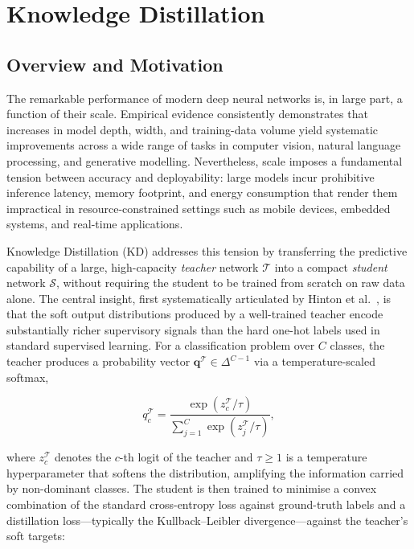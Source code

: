\chapter{Knowledge Distillation}
\label{chap:knowledge_distillation}

\section{Overview and Motivation}
\label{sec:kd_overview}

The remarkable performance of modern deep neural networks is, in large part, a function of their scale.
Empirical evidence consistently demonstrates that increases in model depth, width, and training-data volume
yield systematic improvements across a wide range of tasks in computer vision, natural language processing,
and generative modelling.
Nevertheless, scale imposes a fundamental tension between accuracy and deployability: large models incur
prohibitive inference latency, memory footprint, and energy consumption that render them impractical in
resource-constrained settings such as mobile devices, embedded systems, and real-time applications.

Knowledge Distillation (KD) addresses this tension by transferring the predictive capability of a large,
high-capacity \emph{teacher} network $\mathcal{T}$ into a compact \emph{student} network $\mathcal{S}$,
without requiring the student to be trained from scratch on raw data alone.
The central insight, first systematically articulated by Hinton et al.\ \cite{hinton2015distilling}, is
that the soft output distributions produced by a well-trained teacher encode substantially richer
supervisory signals than the hard one-hot labels used in standard supervised learning.
For a classification problem over $C$ classes, the teacher produces a probability vector
$\mathbf{q}^{\mathcal{T}} \in \Delta^{C-1}$ via a temperature-scaled softmax,

\begin{equation}
    q^{\mathcal{T}}_c = \frac{\exp\!\left(z^{\mathcal{T}}_c / \tau\right)}{\sum_{j=1}^{C} \exp\!\left(z^{\mathcal{T}}_j / \tau\right)},
    \label{eq:soft_softmax}
\end{equation}

\noindent where $z^{\mathcal{T}}_c$ denotes the $c$-th logit of the teacher and $\tau \geq 1$ is a
temperature hyperparameter that softens the distribution, amplifying the information carried by
non-dominant classes.
The student is then trained to minimise a convex combination of the standard cross-entropy loss against
ground-truth labels and a distillation loss—typically the Kullback–Leibler divergence—against the teacher's
soft targets:

